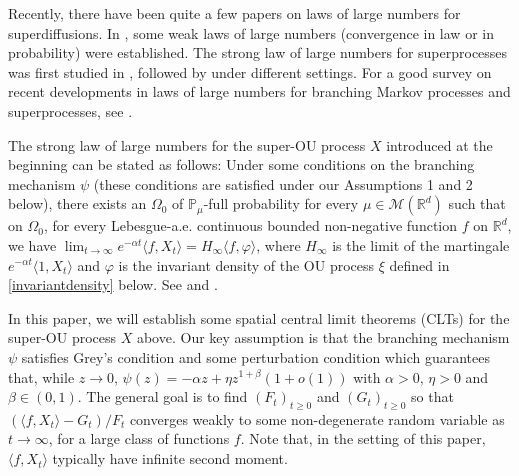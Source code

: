 \documentclass[12pt,a4paper]{amsart}
\theoremstyle{plain}
\theoremstyle{definition}
\numberwithin{equation}{section}
\begin{document}
Recently, there have been quite a few papers on laws of large numbers for superdiffusions.
In \cite{Englander2009Law, EnglanderWinter2006Law, EnglanderTuraev2002A-scaling}, some weak laws of large numbers (convergence in law or in probability) were established.
The strong law of large numbers for superprocesses was first studied in \cite{ChenRenWang2008An-almost}, followed by \cite{ChenRenSongZhang2015Strong-law, ChenRenYang2019Skeleton, EckhoffKyprianouWinkel2015Spines, KouritzinRen2014A-strong, LiuRenSong2013Strong, Wang2010An-almost} under different settings.
For a good survey on recent developments in laws of large numbers for branching Markov processes and superprocesses, see \cite{EckhoffKyprianouWinkel2015Spines}.

The strong law of large numbers for the super-OU process $X$ introduced at the beginning can be stated as follows:
Under some conditions on the branching mechanism $\psi$ (these conditions are satisfied under our Assumptions 1 and 2 below), there exists an $\Omega_0$ of $\mathbb{P}_\mu$-full probability for every $\mu\in\mathcal M(\mathbb R^d)$ such that on $\Omega_0$, for every Lebesgue-a.\/e. continuous bounded non-negative function $f$ on $\mathbb R^d$, we have $\lim_{t\to\infty} e^{-\alpha t} \langle f, X_t\rangle =H_\infty\langle f, \varphi\rangle $, where $H_\infty$ is the limit of the martingale $e^{-\alpha t}\langle 1,X_t\rangle$ and $\varphi$ is the invariant density of the OU process $\xi$ defined in \eqref{invariantdensity} below.
See \cite[Theorem 2.13 \& Example 8.1]{ChenRenYang2019Skeleton} and \cite[Theorem 1.2 \& Example 4.1]{EckhoffKyprianouWinkel2015Spines}.

In this paper, we will establish some spatial central limit theorems (CLTs) for the super-OU process $X$ above.
Our key assumption is that the branching mechanism $\psi$ satisfies Grey's condition and some perturbation condition which guarantees that, while $z\to 0$, $\psi(z)=-\alpha z + \eta z^{1+\beta} (1+o(1))$ with $\alpha > 0$, $\eta>0$ and $\beta\in (0, 1)$.
The general goal is to find $(F_t)_{t\geq 0}$ and $(G_t)_{t\geq 0}$ so that $ (\langle f, X_t \rangle -G_t)/F_t $ converges weakly to some non-degenerate random variable as $t\rightarrow\infty$, for a large class of functions $f$.
Note that, in the setting of this paper, $\langle f,X_t\rangle$ typically have infinite second moment.
\end{document}
